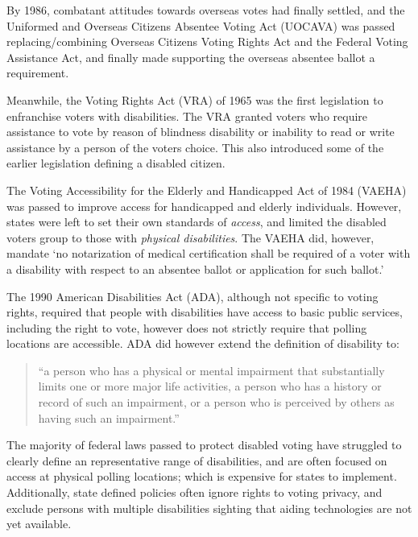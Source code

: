 By 1986, combatant attitudes towards overseas votes had finally settled, and the Uniformed and Overseas Citizens Absentee Voting Act (UOCAVA) was passed replacing/combining Overseas Citizens Voting Rights Act and the Federal Voting Assistance Act, and finally made supporting the overseas absentee ballot a requirement.

Meanwhile, the Voting Rights Act (VRA) of 1965 was the first legislation to enfranchise voters with disabilities. The VRA granted voters who require assistance to vote by reason of blindness disability or inability to read or write assistance by a person of the voters choice. This also introduced some of the earlier legislation defining a disabled citizen.

The Voting Accessibility for the Elderly and Handicapped Act of 1984 (VAEHA) was passed to improve access for handicapped and elderly individuals. However, states were left to set their own standards of {\em access}, and limited the disabled voters group to those with {\em physical disabilities}. The VAEHA did, however, mandate `no notarization of medical certification shall be required of a voter with a disability with respect to an absentee ballot or application for such ballot.'

The 1990 American Disabilities Act (ADA), although not specific to voting rights, required that people with disabilities have access to basic public services, including the right to vote, however does not strictly require that polling locations are accessible. ADA did however extend the definition of disability to:
\begin{quote}``a person who has a physical or mental impairment that substantially limits one or more major life activities, a person who has a history or record of such an impairment, or a person who is perceived by others as having such an impairment.''
\end{quote}

The majority of federal laws passed to protect disabled voting have struggled to clearly define an representative range of disabilities, and are often focused on access at physical polling locations; which is expensive for states to implement. Additionally, state defined policies often ignore rights to voting privacy, and exclude persons with multiple disabilities sighting that aiding technologies are not yet available.



